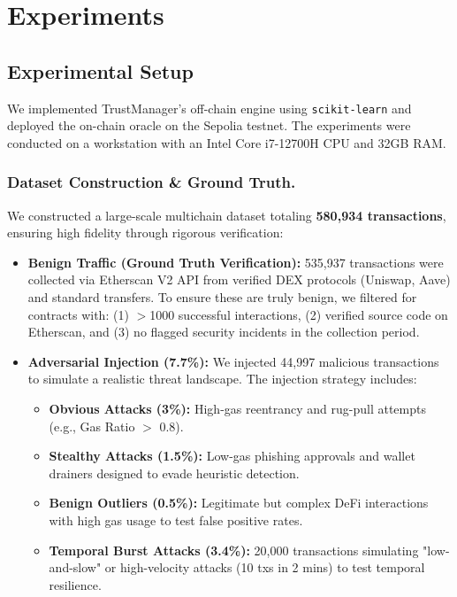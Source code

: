 \section{Experiments}

\subsection{Experimental Setup}
We implemented TrustManager's off-chain engine using \texttt{scikit-learn} and deployed the on-chain oracle on the Sepolia testnet. The experiments were conducted on a workstation with an Intel Core i7-12700H CPU and 32GB RAM.

\subsubsection{Dataset Construction & Ground Truth.}
We constructed a large-scale multichain dataset totaling \textbf{580,934 transactions}, ensuring high fidelity through rigorous verification:
\begin{itemize}
    \item \textbf{Benign Traffic (Ground Truth Verification):} 535,937 transactions were collected via Etherscan V2 API from verified DEX protocols (Uniswap, Aave) and standard transfers. To ensure these are truly benign, we filtered for contracts with: (1) $>$1000 successful interactions, (2) verified source code on Etherscan, and (3) no flagged security incidents in the collection period.
    \item \textbf{Adversarial Injection (7.7\%):} We injected 44,997 malicious transactions to simulate a realistic threat landscape. The injection strategy includes:
    \begin{itemize}
        \item \textbf{Obvious Attacks (3\%):} High-gas reentrancy and rug-pull attempts (e.g., Gas Ratio $>$ 0.8).
        \item \textbf{Stealthy Attacks (1.5\%):} Low-gas phishing approvals and wallet drainers designed to evade heuristic detection.
        \item \textbf{Benign Outliers (0.5\%):} Legitimate but complex DeFi interactions with high gas usage to test false positive rates.
        \item \textbf{Temporal Burst Attacks (3.4\%):} 20,000 transactions simulating "low-and-slow" or high-velocity attacks (10 txs in 2 mins) to test temporal resilience.
    \end{itemize}
\end{itemize}

